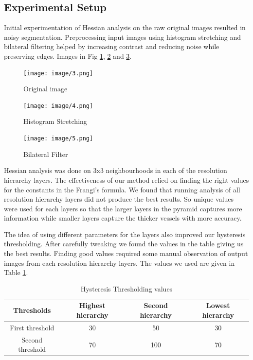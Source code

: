 \documentclass[conference]{IEEEtran}
\begin{document}
\subsection{Experimental Setup}
\label{ssec:gsetup}
\par

Initial experimentation of Hessian analysis on the raw original images resulted in noisy segmentation. Preprocessing input images using histogram stretching and bilateral filtering helped by increasing contrast and reducing noise while preserving edges. Images in Fig \ref{fig:3}, \ref{fig:4} and \ref{fig:5}.
\par

\begin{figure}[H]
	\centering
	\texttt{[image: image/3.png]}
	\caption{Original image}
	\label{fig:3}
\end{figure}

\begin{figure}[H]
	\centering
	\texttt{[image: image/4.png]}
	\caption{Histogram Stretching}
	\label{fig:4}
\end{figure}

\begin{figure}[H]
	\centering
	\texttt{[image: image/5.png]}
	\caption{Bilateral Filter}
	\label{fig:5}
\end{figure}


Hessian analysis was done on 3x3 neighbourhoods in each of the resolution hierarchy layers. The effectiveness of our method relied on finding the right values for the constants in the Frangi’s formula. We found that running analysis of all resolution hierarchy layers did not produce the best results. So unique values were used for each layers so that the larger layers in the pyramid captures more information while smaller layers capture the thicker vessels with more accuracy.
\par
The idea of using different parameters for the layers also improved our hysteresis thresholding. After carefully tweaking we found the values in the table giving us the best results. Finding good values required some manual observation of output images from each resolution hierarchy layers. The values we used are given in Table \ref{table:2}.

\begin{table}[t]
\centering
 \begin{tabular}{|c| c c c|} 
 \hline
 Thresholds & Highest hierarchy & Second hierarchy & Lowest hierarchy\\ [0.5ex] 
 \hline
 First threshold & 30 & 50 & 30 \\ 
 \hline
 Second threshold & 70 & 100 & 70\\
 \hline
\end{tabular}
\vspace*{0.25cm}
\caption{Hysteresis Thresholding values}
\label{table:2}
\end{table}
\end{document}
